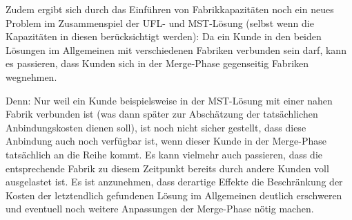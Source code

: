 \documentclass[a4paper,ngerman,11pt,bibtotoc]{scrartcl}
\theoremstyle{definition}
\theoremstyle{plain}
\theoremstyle{remark}
\newcommand{\MST}{MST}
\newcommand{\UFL}{UFL}
\begin{document}
Zudem ergibt sich durch das Einführen von Fabrikkapazitäten noch ein neues Problem im Zusammenspiel der \UFL- und \MST-Lösung (selbst wenn die Kapazitäten in diesen berücksichtigt werden): Da ein Kunde in den beiden Lösungen im Allgemeinen mit verschiedenen Fabriken verbunden sein darf, kann es passieren, dass Kunden sich in der Merge-Phase gegenseitig Fabriken \glqq wegnehmen\grqq. 

Denn: Nur weil ein Kunde beispielsweise in der \MST-Lösung mit einer nahen Fabrik verbunden ist (was dann später zur Abschätzung der tatsächlichen Anbindungskosten dienen soll), ist noch nicht sicher gestellt, dass diese Anbindung auch noch verfügbar ist, wenn dieser Kunde in der Merge-Phase tatsächlich an die Reihe kommt. Es kann vielmehr auch passieren, dass die entsprechende Fabrik zu diesem Zeitpunkt bereits durch andere Kunden voll ausgelastet ist. Es ist anzunehmen, dass derartige Effekte die Beschränkung der Kosten der letztendlich gefundenen Lösung im Allgemeinen deutlich erschweren und eventuell noch weitere Anpassungen der Merge-Phase nötig machen.

\newpage	

\newpage
\nocite{*}
\printbibliography		
			
\end{document}
